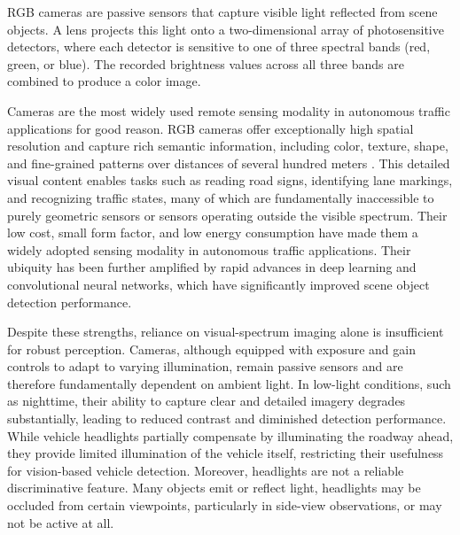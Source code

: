 \documentclass[12pt,oneside,bibtotoc,liststotoc]{scrbook}
\begin{document}
RGB cameras are passive sensors that capture visible light reflected
from scene objects. A lens projects this light onto a two-dimensional
array of photosensitive detectors, where each detector is sensitive to
one of three spectral bands (red, green, or blue). The recorded
brightness values across all three bands are combined to produce a
color image.
\citetext{\citealp[pp.~66, 81, 93]{szeliski2022computerVision}; \citealp[pp.~89, 115]{lillesand2015remoteSensing}; \citealp{agrawal2019comparativeRemoteSensing}}

Cameras are the most widely used remote sensing modality in autonomous
traffic applications for good reason. RGB cameras offer exceptionally
high spatial resolution and capture rich semantic information, including
color, texture, shape, and fine-grained patterns over distances of several
hundred meters \cite{wu2025comparativeAnalysisLiDARRadarCamera}. This
detailed visual content enables tasks such as reading road signs, identifying
lane markings, and recognizing traffic states, many of which are fundamentally
inaccessible to purely geometric sensors or sensors operating outside the
visible spectrum.
Their low cost, small form factor, and low energy consumption
have made them a widely adopted sensing modality in autonomous
traffic applications.
Their ubiquity has been further amplified by rapid advances in deep learning
and convolutional neural networks, which have significantly improved scene
object detection performance.
\cite{soltanirad2025autonomousTransportationPerception,bustos2023reviewObjectDetectionIR}

Despite these strengths, reliance on visual-spectrum imaging alone is
insufficient for robust perception. Cameras, although equipped with
exposure and gain controls to adapt to varying illumination, remain
passive sensors and are therefore fundamentally dependent on ambient
light. In low-light conditions, such as nighttime, their ability to
capture clear and detailed imagery degrades substantially, leading to
reduced contrast and diminished detection performance. While vehicle
headlights partially compensate by illuminating the roadway ahead, they
provide limited illumination of the vehicle itself, restricting their
usefulness for vision-based vehicle detection. Moreover, headlights are
not a reliable discriminative feature. Many objects emit or reflect light,
headlights may be occluded from certain viewpoints, particularly in
side-view observations, or may not be active at all.
\end{document}
